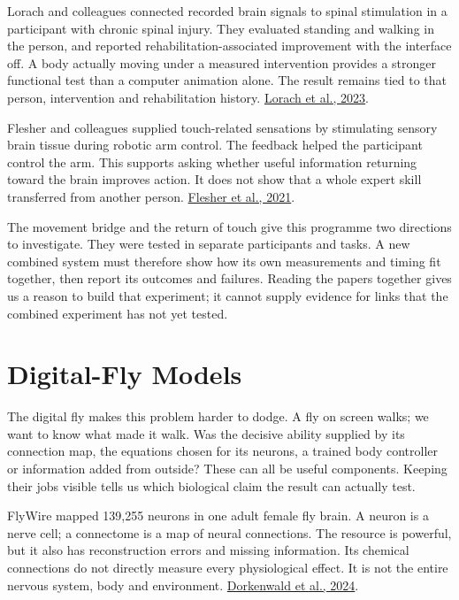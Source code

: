 Lorach and colleagues connected recorded brain signals to spinal stimulation in a participant with chronic spinal injury. They evaluated standing and walking in the person, and reported rehabilitation-associated improvement with the interface off. A body actually moving under a measured intervention provides a stronger functional test than a computer animation alone. The result remains tied to that person, intervention and rehabilitation history. \href{https://www.nature.com/articles/s41586-023-06094-5}{Lorach et al., 2023}.\par

Flesher and colleagues supplied touch-related sensations by stimulating sensory brain tissue during robotic arm control. The feedback helped the participant control the arm. This supports asking whether useful information returning toward the brain improves action. It does not show that a whole expert skill transferred from another person. \href{https://pubmed.ncbi.nlm.nih.gov/34016775/}{Flesher et al., 2021}.\par

The movement bridge and the return of touch give this programme two directions to investigate. They were tested in separate participants and tasks. A new combined system must therefore show how its own measurements and timing fit together, then report its outcomes and failures. Reading the papers together gives us a reason to build that experiment; it cannot supply evidence for links that the combined experiment has not yet tested.\par

\section{Digital-Fly Models}

The digital fly makes this problem harder to dodge. A fly on screen walks;
we want to know what made it walk. Was the decisive ability supplied by its
connection map, the equations chosen for its neurons, a trained body controller
or information added from outside? These can all be useful components. Keeping
their jobs visible tells us which biological claim the result can actually
test.\par

FlyWire mapped 139,255 neurons in one adult female fly brain. A neuron is a nerve cell; a connectome is a map of neural connections. The resource is powerful, but it also has reconstruction errors and missing information. Its chemical connections do not directly measure every physiological effect. It is not the entire nervous system, body and environment. \href{https://www.nature.com/articles/s41586-024-07558-y}{Dorkenwald et al., 2024}.\par

